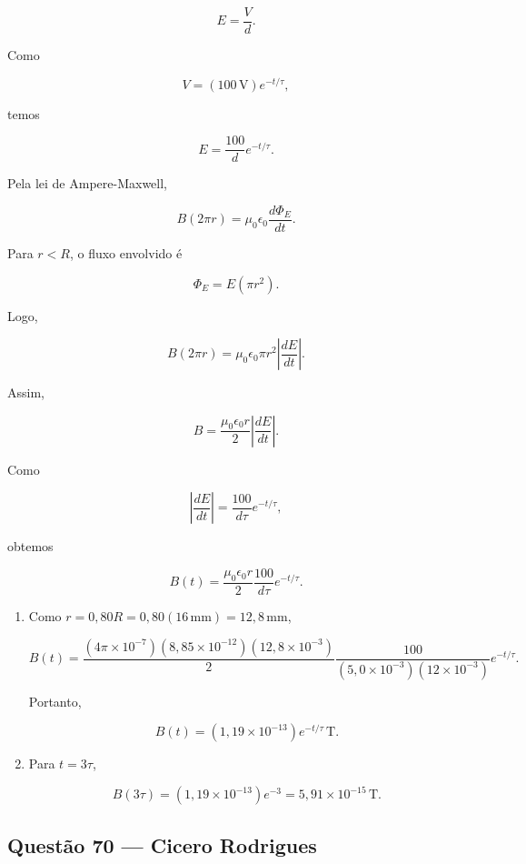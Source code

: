 \documentclass[12pt,a4paper]{article}
\begin{document}
\[
E=\frac{V}{d}.
\]

Como

\[
V=(100\,\text{V})e^{-t/\tau},
\]

temos

\[
E=\frac{100}{d}e^{-t/\tau}.
\]

Pela lei de Ampere-Maxwell,

\[
B(2\pi r)=\mu_0\epsilon_0\frac{d\Phi_E}{dt}.
\]

Para \(r<R\), o fluxo envolvido é

\[
\Phi_E=E(\pi r^2).
\]

Logo,

\[
B(2\pi r)=\mu_0\epsilon_0\pi r^2
\left|\frac{dE}{dt}\right|.
\]

Assim,

\[
B=\frac{\mu_0\epsilon_0 r}{2}
\left|\frac{dE}{dt}\right|.
\]

Como

\[
\left|\frac{dE}{dt}\right|
=
\frac{100}{d\tau}e^{-t/\tau},
\]

obtemos

\[
B(t)=
\frac{\mu_0\epsilon_0 r}{2}
\frac{100}{d\tau}e^{-t/\tau}.
\]

\begin{enumerate}
    \item[(a)] Como \(r=0{,}80R=0{,}80(16\,\text{mm})=12{,}8\,\text{mm}\),

    \[
    B(t)=
    \frac{(4\pi\times 10^{-7})(8{,}85\times 10^{-12})
    (12{,}8\times 10^{-3})}{2}
    \frac{100}{(5{,}0\times 10^{-3})(12\times 10^{-3})}
    e^{-t/\tau}.
    \]

    Portanto,

    \[
    B(t)=
    (1{,}19\times 10^{-13})e^{-t/\tau}\,\text{T}.
    \]

    \item[(b)] Para \(t=3\tau\),

    \[
    B(3\tau)=
    (1{,}19\times 10^{-13})e^{-3}
    =
    5{,}91\times 10^{-15}\,\text{T}.
    \]
\end{enumerate}

\subsection{Questão 70 — Cicero Rodrigues}
\end{document}
